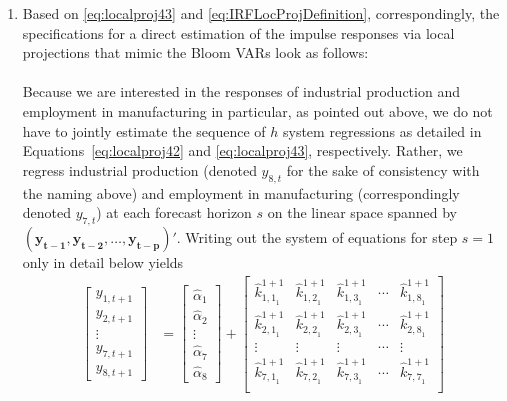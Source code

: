 \documentclass[a4paper,11pt,listof=nochaptergap,oneside,pointednumbers,bibtotoc,bigheadings,liststotoc]{scrbook}
\theoremstyle{mysatz}
\theoremstyle{mydefinition}
\theoremstyle{mybemerkung}
\let\oldhat\hat
\newcommand{\vect}[1]{\boldsymbol{\mathbf{#1}}}
\newcommand{\hattnobf}[1]{\oldhat{#1}}
\begin{document}
\begin{itemize}
\begin{enumerate}
\item Based on \ref{eq:localproj43} and \ref{eq:IRFLocProjDefinition}, correspondingly, the specifications for a direct estimation of the impulse responses via local projections that mimic the Bloom VARs look as follows:\\
\\
Because we are interested in the responses of industrial production and employment in manufacturing in particular, as pointed out above, we do not have to jointly estimate the sequence of $h$ system regressions as detailed in Equations~\ref{eq:localproj42} and \ref{eq:localproj43}, respectively. Rather, we regress industrial production (denoted $y_{8,t}$ for the sake of consistency with the naming above) and employment in manufacturing (correspondingly denoted $y_{7, t}$) at each forecast horizon $s$ on the linear space spanned by $(\vect{y_{t-1}}, \vect{y_{t-2}}, \dots, \vect{y_{t-p}})'$. Writing out the system of equations for step $s=1$ only in detail below yields
\begin{equation} \label{eq:localproj46}
\begin{split}
		\begin{bmatrix}
    		y_{1,t+1} \\
    		y_{2,t+1} \\
		\vdots \\
		y_{7, t+1} \\
		y_{8,t+1}
 		\end{bmatrix} & = 
		\begin{bmatrix}
    		\hattnobf{\alpha}_{{1}} \\
    		\hattnobf{\alpha}_{{2}} \\
		\vdots \\
		\hattnobf{\alpha}_{{7}} \\
		\hattnobf{\alpha}_{{8}}
 		\end{bmatrix} + 
		\begin{bmatrix}
    		{\hattnobf{k}_{{1, 1}_1}^{1+1}} & {\hattnobf{k}_{{1, 2}_1}^{1+1}} & {\hattnobf{k}_{{1, 3}_1}^{1+1}} & \cdots & {\hattnobf{k}_{{1, 8}_1}^{1+1}}\\
    		{\hattnobf{k}_{{2, 1}_1}^{1+1}} & {\hattnobf{k}_{{2, 2}_1}^{1+1}} & {\hattnobf{k}_{{2, 3}_1}^{1+1}} & \cdots & {\hattnobf{k}_{{2, 8}_1}^{1+1}}\\
		\vdots & \vdots & \vdots & \cdots & \vdots \\
		{\hattnobf{k}_{{7, 1}_1}^{1+1}} & {\hattnobf{k}_{{7, 2}_1}^{1+1}} & {\hattnobf{k}_{{7, 3}_1}^{1+1}} & \cdots & {\hattnobf{k}_{{7, 7}_1}^{1+1}}\\

\end{bmatrix}
\end{split}
\end{equation}
\end{enumerate}
\end{itemize}
\end{document}
